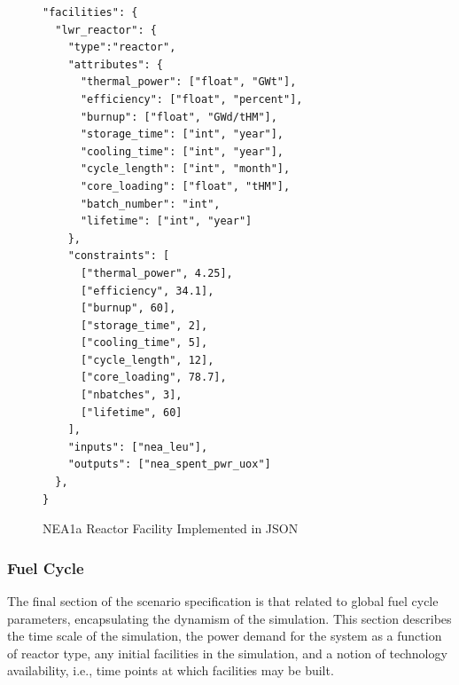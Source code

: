 \begin{figure}[h!]
\begin{Verbatim}[frame=single]
"facilities": {
  "lwr_reactor": {
    "type":"reactor",
    "attributes": {
      "thermal_power": ["float", "GWt"],
      "efficiency": ["float", "percent"],
      "burnup": ["float", "GWd/tHM"],
      "storage_time": ["int", "year"],
      "cooling_time": ["int", "year"],
      "cycle_length": ["int", "month"],
      "core_loading": ["float", "tHM"],
      "batch_number": "int",
      "lifetime": ["int", "year"]
    },
    "constraints": [
      ["thermal_power", 4.25],
      ["efficiency", 34.1],
      ["burnup", 60],
      ["storage_time", 2],
      ["cooling_time", 5],
      ["cycle_length", 12],
      ["core_loading", 78.7],
      ["nbatches", 3],
      ["lifetime", 60]
    ],
    "inputs": ["nea_leu"],
    "outputs": ["nea_spent_pwr_uox"]
  },
}
\end{Verbatim}
\caption{NEA1a Reactor Facility Implemented in JSON}
\label{fig:facility}
\end{figure}

\subsubsection{Fuel Cycle}
The final section of the scenario specification is that related to global fuel
cycle parameters, encapsulating the dynamism of the simulation. This section
describes the time scale of the simulation, the power demand for the system as a
function of reactor type, any initial facilities in the simulation, and a notion
of technology availability, i.e., time points at which facilities may be built.


